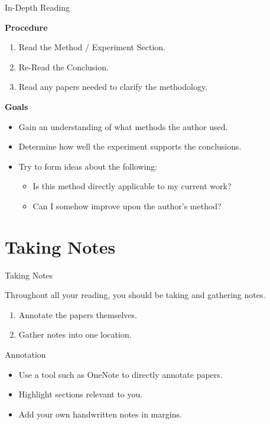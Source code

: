 \documentclass[handout]{beamer}
\begin{document}
\begin{frame}{In-Depth Reading}

    {\bf Procedure}
    \begin{enumerate}
        \item Read the Method / Experiment Section.
        \item Re-Read the Conclusion.
        \item Read any papers needed to clarify the methodology.
    \end{enumerate}
    
    \vspace{1em}
    
    {\bf Goals}
    \begin{itemize}
        \item Gain an understanding of what methods the author used.
        \item Determine how well the experiment supports the conclusions.
        \item Try to form ideas about the following:
        \begin{itemize}
            \item Is this method directly applicable to my current work?
            \item Can I somehow improve upon the author's method?
        \end{itemize}
    \end{itemize}
    
\end{frame}

\section{Taking Notes}
\begin{frame}{Taking Notes}
    \begin{block}{}
        Throughout all your reading, you should be taking and gathering notes.
    \end{block}
    
    \begin{enumerate}
        \item Annotate the papers themselves.
        \item Gather notes into one location.
    \end{enumerate}
\end{frame}

\begin{frame}{Annotation}
    \begin{itemize}
        \item Use a tool such as OneNote to directly annotate papers.
        \item Highlight sections relevant to you.
        \item Add your own handwritten notes in margins.
    \end{itemize}
\end{frame}
\end{document}

